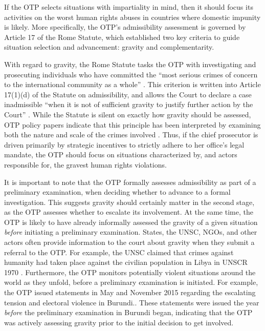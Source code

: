 If the OTP selects situations with impartiality in mind, then it should focus its activities on the worst human rights abuses in countries where domestic impunity is likely. More specifically, the OTP's admissibility assessment is governed by Article 17 of the Rome Statute, which established two key criteria to guide situation selection and advancement: gravity and complementarity.

With regard to gravity, the Rome Statute tasks the OTP with investigating and prosecuting individuals who have committed the ``most serious crimes of concern to the international community as a whole'' \citep[5,1]{rome}. This criterion is written into Article 17(1)(d) of the Statute on admissibility, and allows the Court to declare a case inadmissible ``when it is not of sufficient gravity to justify further action by the Court'' \citep[200]{schabas2011introduction}. While the Statute is silent on exactly how gravity should be assessed, OTP policy papers indicate that this principle has been interpreted by examining both the nature and scale of the crimes involved \citep{smeulers2015selection}. Thus, if the chief prosecutor is driven primarily by strategic incentives to strictly adhere to her office's legal mandate, the OTP should focus on situations characterized by, and actors responsible for, the gravest human rights violations.

It is important to note that the OTP formally assesses admissibility as part of a preliminary examination, when deciding whether to advance to a formal investigation. This suggests gravity should certainly matter in the second stage, as the OTP assesses whether to escalate its involvement. At the same time, the OTP is likely to have already informally assessed the gravity of a given situation \emph{before} initiating a preliminary examination. States, the UNSC, NGOs, and other actors often provide information to the court about gravity when they submit a referral to the OTP. For example, the UNSC claimed that crimes against humanity had taken place against the civilian population in Libya in UNSCR 1970 \citep{unsc1970}. Furthermore, the OTP monitors potentially violent situations around the world as they unfold, before a preliminary examination is initiated. For example, the OTP issued statements in May and November 2015 regarding the escalating tension and electoral violence in Burundi.\citep{bensouda15}. These statements were issued the year \emph{before} the preliminary examination in Burundi began, indicating that the OTP was actively assessing gravity prior to the initial decision to get involved.

